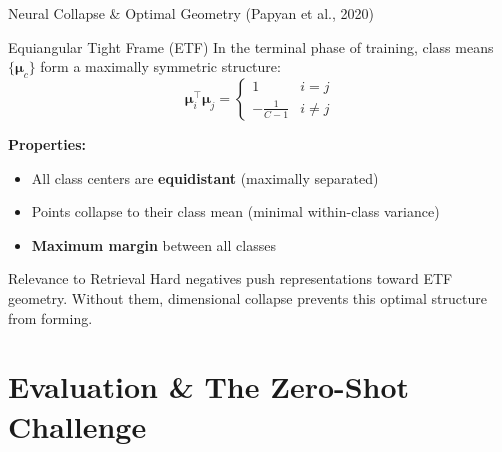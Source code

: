 \documentclass[aspectratio=169]{beamer}
\newif\ifanimated
\newcommand{\cpause}{\ifanimated\pause\fi}
\begin{document}
\begin{frame}{Neural Collapse \& Optimal Geometry (Papyan et al., 2020)}
\begin{block}{Equiangular Tight Frame (ETF)}
In the terminal phase of training, class means $\{\boldsymbol{\mu}_c\}$ form a maximally symmetric structure:
$$\boldsymbol{\mu}_i^\top \boldsymbol{\mu}_j = \begin{cases}
1 & i = j \\
-\frac{1}{C-1} & i \neq j
\end{cases}$$
\end{block}

\vspace{0.5em}

\textbf{Properties:}
\begin{itemize}
    \item All class centers are \textbf{equidistant} (maximally separated)
    \item Points collapse to their class mean (minimal within-class variance)
    \item \textbf{Maximum margin} between all classes
\end{itemize}

\cpause
\vspace{0.5em}

\begin{exampleblock}{Relevance to Retrieval}
Hard negatives push representations toward ETF geometry. Without them, dimensional collapse prevents this optimal structure from forming.
\end{exampleblock}
\end{frame}

\section{Evaluation \& The Zero-Shot Challenge}

\begin{frame}[plain]
\sectionpage
\end{frame}
\end{document}
